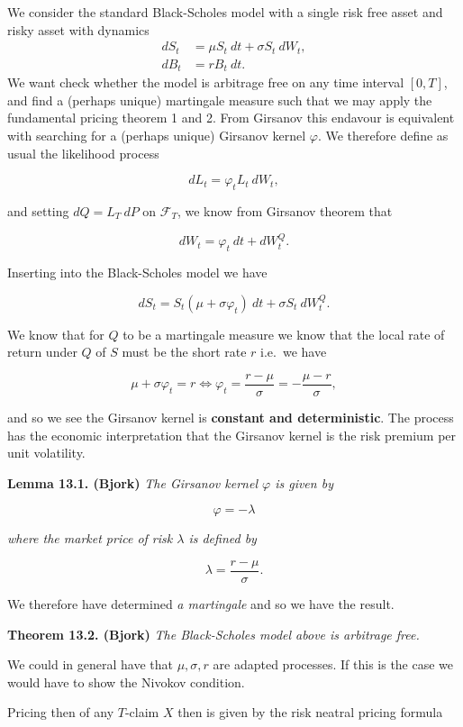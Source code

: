 \documentclass[a4paper,10pt,openany]{book}
\begin{document}
We consider the standard Black-Scholes model with a single risk free asset and risky asset with dynamics
\begin{align*}
dS_t &= \mu S_t\ dt+\sigma S_t\ dW_t,\tag{13.1}\\
dB_t &= r B_t\ dt.\tag{13.2}
\end{align*}
We want check whether the model is arbitrage free on any time interval \([0,T]\), and find a (perhaps unique) martingale measure such that we may apply the fundamental pricing theorem 1 and 2. From Girsanov this endavour is equivalent with searching for a (perhaps unique) Girsanov kernel \(\varphi\). We therefore define as usual the likelihood process

\[
dL_t=\varphi_ tL_t\ dW_t,
\]

and setting \(dQ=L_T\ dP\) on \(\mathcal{F}_T\), we know from Girsanov theorem that

\[
dW_t=\varphi_t\ dt+dW_t^Q.
\]

Inserting into the Black-Scholes model we have

\[
dS_t=S_t(\mu + \sigma \varphi_t)\ dt+\sigma S_t\ dW_t^Q.
\]

We know that for \(Q\) to be a martingale measure we know that the local rate of return under \(Q\) of \(S\) must be the short rate \(r\) i.e.~we have

\[
\mu + \sigma \varphi_t=r\iff \varphi_t=\frac{r-\mu}{\sigma}=-\frac{\mu -r}{\sigma},\tag{13.3}
\]

and so we see the Girsanov kernel is \textbf{constant and deterministic}. The process has the economic interpretation that the Girsanov kernel is the risk premium per unit volatility.

\textbf{Lemma 13.1. (Bjork)} \emph{The Girsanov kernel \(\varphi\) is given by}

\[
\varphi = -\lambda
\]

\emph{where the market price of risk \(\lambda\) is defined by}

\[
\lambda =\frac{r-\mu}{\sigma}.
\]

We therefore have determined \emph{a martingale} and so we have the result.

\textbf{Theorem 13.2. (Bjork)} \emph{The Black-Scholes model above is arbitrage free.}

We could in general have that \(\mu,\sigma,r\) are adapted processes. If this is the case we would have to show the Nivokov condition.

Pricing then of any \(T\)-claim \(X\) then is given by the risk neatral pricing formula
\end{document}
